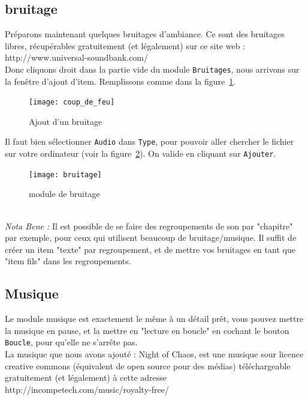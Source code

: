 \documentclass[a4paper,12pt]{article}
\newcommand*{\interfaceitem}[1]{\texttt{#1}}
\begin{document}
\subsection{bruitage}
Préparons maintenant quelques bruitages d'ambiance. Ce sont des bruitages libres, récupérables gratuitement (et légalement) sur ce site web : http://www.universal-soundbank.com/
\\
Donc cliquons droit dans la partie vide du module \interfaceitem{Bruitages}, nous arrivons sur la fenêtre d'ajout d'item. Remplissons comme dans la figure~\ref{coup de feu}.
\begin{figure}[h!]
    \texttt{[image: coup\_de\_feu]}
    \caption{Ajout d'un bruitage}
    \label{coup de feu}
\end{figure}
Il faut bien sélectionner \interfaceitem{Audio} dans \interfaceitem{Type}, pour pouvoir aller chercher le fichier sur votre ordinateur (voir la figure~\ref{exemple_bruitage}).
On valide en cliquant sur \interfaceitem{Ajouter}.
\begin{figure}[h!]
    \texttt{[image: bruitage]}
    \caption{module de bruitage}
    \label{exemple_bruitage}
\end{figure}
\\ \emph{Nota Bene :} Il est possible de se faire des regroupements de son par "chapitre" par exemple, pour ceux qui utilisent beaucoup de bruitage/musique. Il suffit de créer un item "texte" par regroupement, et de mettre vos bruitages en tant que "item fils" dans les regroupements.

\subsection{Musique}
Le module musique est exactement le même à un détail prêt, vous pouvez mettre la musique en pause, et la mettre en "lecture en boucle" en cochant le bouton \interfaceitem{Boucle}, pour qu'elle ne s'arrête pas.
\\
La musique que nous avons ajouté : Night of Chaos, est une musique sour licence creative commons (équivalent de open source pour des médias) téléchargeable gratuitement (et légalement) à cette adresse http://incompetech.com/music/royalty-free/
\end{document}
